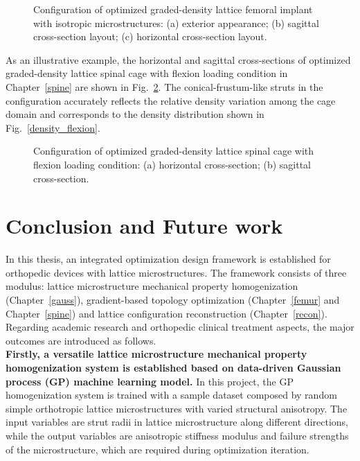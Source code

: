 \documentclass[12pt]{extbook}
\begin{document}
\begin{figure}[htbp]
\centering
{}
\caption{Configuration of optimized graded-density lattice femoral implant with isotropic microstructures: (a) exterior appearance; (b) sagittal cross-section layout; (c) horizontal cross-section layout.}
\label{config_femur_isot}
\end{figure}



As an illustrative example, the horizontal and sagittal cross-sections of optimized graded-density lattice spinal cage with flexion loading condition in Chapter~\ref{spine} are shown in Fig.~\ref{config_spine}. The conical-frustum-like struts in the configuration accurately reflects the relative density variation among the cage domain and corresponds to the density distribution shown in Fig.~\ref{density_flexion}.\\

\begin{figure}[htbp]
\centering
{}
\caption{Configuration of optimized graded-density lattice spinal cage with flexion loading condition: (a) horizontal cross-section; (b) sagittal cross-section.}
\label{config_spine}
\end{figure}



\chapter{Conclusion and Future work}
\label{concl}

In this thesis, an integrated optimization design framework is established for orthopedic devices with lattice microstructures. The framework consists of three modulus: lattice microstructure mechanical property homogenization (Chapter~\ref{gauss}), gradient-based topology optimization (Chapter~\ref{femur} and Chapter~\ref{spine}) and lattice configuration reconstruction (Chapter~\ref{recon}). Regarding academic research and orthopedic clinical treatment aspects, the major outcomes are introduced as follows.\\

{\bf Firstly, a versatile lattice microstructure mechanical property homogenization system is established based on data-driven Gaussian process (GP) machine learning model.} In this project, the GP homogenization system is trained with a sample dataset composed by random simple orthotropic lattice microstructures with varied structural anisotropy. The input variables are strut radii in lattice microstructure along different directions, while the output variables are anisotropic stiffness modulus and failure strengths of the microstructure, which are required during optimization iteration.\\
\end{document}
